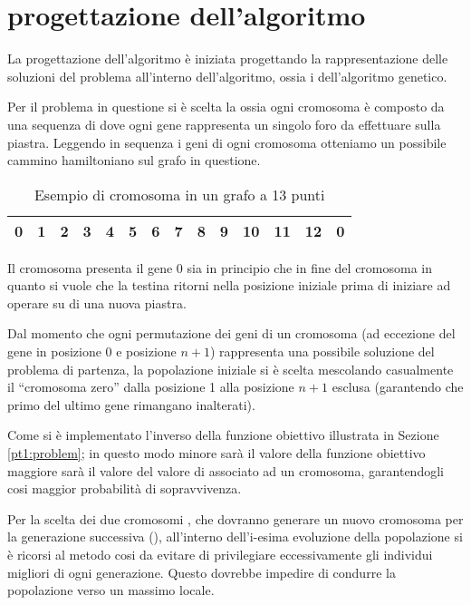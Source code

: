 %
%
\section[Progettazione dell'algoritmo]{progettazione dell'algoritmo}
\label{pt2:design}
La progettazione dell'algoritmo è iniziata progettando la rappresentazione delle soluzioni del problema all'interno dell'algoritmo, ossia i  dell'algoritmo genetico.

Per il problema in questione si è scelta la  ossia ogni cromosoma è composto da una sequenza di  dove ogni gene rappresenta un singolo foro da effettuare sulla piastra. Leggendo in sequenza i geni di ogni cromosoma otteniamo un possibile cammino hamiltoniano sul grafo in questione.

\begin{table}
\centering
\begin{tabular}{|c|c|c|c|c|c|c|c|c|c|c|c|c|c|}
\hline 
0 & 1 & 2 & 3 & 4 & 5 & 6 & 7 & 8 & 9 & 10 & 11 & 12 & 0\\
\hline 
\end{tabular}
\caption{Esempio di cromosoma in un grafo a 13 punti}
\end{table}

Il cromosoma presenta il gene 0 sia in principio che in fine del cromosoma in quanto si vuole che la testina ritorni nella posizione iniziale prima di iniziare ad operare su di una nuova piastra.

Dal momento che ogni permutazione dei geni di un cromosoma (ad eccezione del gene in posizione 0 e posizione $n + 1$) rappresenta una possibile soluzione del problema di partenza, la popolazione iniziale si è scelta mescolando casualmente il ``cromosoma zero'' dalla posizione 1 alla posizione $n + 1$ esclusa (garantendo che primo del ultimo gene rimangano inalterati).

Come  si è implementato l'inverso della funzione obiettivo illustrata in Sezione \ref{pt1:problem}; in questo modo minore sarà il valore della funzione obiettivo maggiore sarà il valore del valore di  associato ad un cromosoma, garantendogli cosi maggior probabilità di sopravvivenza.

Per la scelta dei due cromosomi , che dovranno generare un nuovo cromosoma per la generazione successiva (), all'interno dell'i-esima evoluzione della popolazione si è ricorsi al metodo  cosi da evitare di privilegiare eccessivamente gli individui migliori di ogni generazione. Questo dovrebbe impedire di condurre la popolazione verso un massimo locale.


